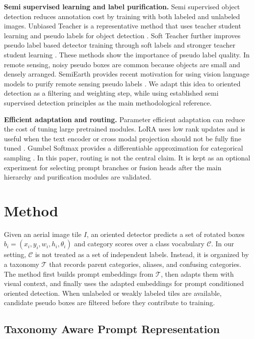 \documentclass[10pt]{article}
\begin{document}
\textbf{Semi supervised learning and label purification.}
Semi supervised object detection reduces annotation cost by training with both labeled and unlabeled images. Unbiased Teacher is a representative method that uses teacher student learning and pseudo labels for object detection \cite{liu2021unbiased}. Soft Teacher further improves pseudo label based detector training through soft labels and stronger teacher student learning \cite{xu2021softteacher}. These methods show the importance of pseudo label quality. In remote sensing, noisy pseudo boxes are common because objects are small and densely arranged. SemiEarth provides recent motivation for using vision language models to purify remote sensing pseudo labels \cite{semiearth2026}. We adapt this idea to oriented detection as a filtering and weighting step, while using established semi supervised detection principles as the main methodological reference.

\textbf{Efficient adaptation and routing.}
Parameter efficient adaptation can reduce the cost of tuning large pretrained modules. LoRA uses low rank updates and is useful when the text encoder or cross modal projection should not be fully fine tuned \cite{hu2021lora}. Gumbel Softmax provides a differentiable approximation for categorical sampling \cite{jang2017gumbel,maddison2017concrete}. In this paper, routing is not the central claim. It is kept as an optional experiment for selecting prompt branches or fusion heads after the main hierarchy and purification modules are validated.

\section{Method}

Given an aerial image tile $I$, an oriented detector predicts a set of rotated boxes $b_i=(x_i,y_i,w_i,h_i,\theta_i)$ and category scores over a class vocabulary $\mathcal{C}$. In our setting, $\mathcal{C}$ is not treated as a set of independent labels. Instead, it is organized by a taxonomy $\mathcal{T}$ that records parent categories, aliases, and confusing categories. The method first builds prompt embeddings from $\mathcal{T}$, then adapts them with visual context, and finally uses the adapted embeddings for prompt conditioned oriented detection. When unlabeled or weakly labeled tiles are available, candidate pseudo boxes are filtered before they contribute to training.

\subsection{Taxonomy Aware Prompt Representation}
\end{document}
